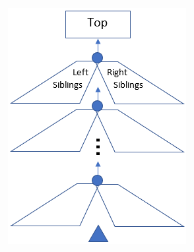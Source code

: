 \begin{frame}
\begin{columns}
\begin{column}{0.75\textwidth}
\begin{figure}
\centering
\includegraphics[width=0.6\textwidth]{figure/zipper}
\end{figure}
\end{column}
\begin{column}{0.3\textwidth}
\begin{figure}

\end{figure}
\end{column}
\end{columns}
\end{frame}
